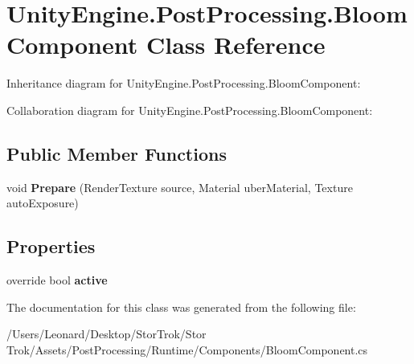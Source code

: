 \hypertarget{class_unity_engine_1_1_post_processing_1_1_bloom_component}{}\section{Unity\+Engine.\+Post\+Processing.\+Bloom\+Component Class Reference}
\label{class_unity_engine_1_1_post_processing_1_1_bloom_component}


Inheritance diagram for Unity\+Engine.\+Post\+Processing.\+Bloom\+Component\+:


Collaboration diagram for Unity\+Engine.\+Post\+Processing.\+Bloom\+Component\+:
\subsection*{Public Member Functions}
\begin{DoxyCompactItemize}
\item 
\mbox{\label{class_unity_engine_1_1_post_processing_1_1_bloom_component_a36a84fe1a81b038c9e1e0b9e8053c63f}} 
void {\bfseries Prepare} (Render\+Texture source, Material uber\+Material, Texture auto\+Exposure)
\end{DoxyCompactItemize}
\subsection*{Properties}
\begin{DoxyCompactItemize}
\item 
\mbox{\label{class_unity_engine_1_1_post_processing_1_1_bloom_component_a8ad2506285bcf581fc6b39f04650baa7}} 
override bool {\bfseries active}
\end{DoxyCompactItemize}


The documentation for this class was generated from the following file\+:\begin{DoxyCompactItemize}
\item 
/\+Users/\+Leonard/\+Desktop/\+Stor\+Trok/\+Stor Trok/\+Assets/\+Post\+Processing/\+Runtime/\+Components/Bloom\+Component.\+cs\end{DoxyCompactItemize}
